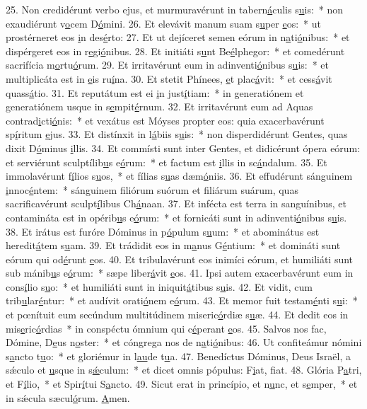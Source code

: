 25. Non credidérunt verbo ejus, et murmuravérunt in tabern\uline{á}culis s\uline{u}is:~* non exaudiérunt v\uline{o}cem D\uline{ó}mini.
26. Et elevávit manum suam s\uline{u}per \uline{e}os:~* ut prostérneret eos \uline{i}n des\uline{é}rto:
27. Et ut dejíceret semen eórum in n\uline{a}ti\uline{ó}nibus:~* et dispérgeret eos in r\uline{e}gi\uline{ó}nibus.
28. Et initiáti s\uline{u}nt Be\uline{é}lphegor:~* et comedérunt sacrifícia m\uline{o}rtu\uline{ó}rum.
29. Et irritavérunt eum in adinventi\uline{ó}nibus s\uline{u}is:~* et multiplicáta est in \uline{e}is ru\uline{í}na.
30. Et stetit Phínees, \uline{e}t plac\uline{á}vit:~* et cess\uline{á}vit quass\uline{á}tio.
31. Et reputátum est ei \uline{i}n just\uline{í}tiam:~* in generatiónem et generatiónem usque in s\uline{e}mpit\uline{é}rnum.
32. Et irritavérunt eum ad Aquas contrad\uline{i}cti\uline{ó}nis:~* et vexátus est Móyses propter eos: quia exacerbavérunt sp\uline{í}ritum \uline{e}jus.
33. Et distínxit in l\uline{á}biis s\uline{u}is:~* non disperdidérunt Gentes, quas dixit D\uline{ó}minus \uline{i}llis.
34. Et commísti sunt inter Gentes, et didicérunt ópera eórum: et serviérunt sculptílib\uline{u}s e\uline{ó}rum:~* et factum est \uline{i}llis in sc\uline{á}ndalum.
35. Et immolavérunt f\uline{í}lios s\uline{u}os,~* et fílias s\uline{u}as dæm\uline{ó}niis.
36. Et effudérunt sánguinem \uline{i}nnoc\uline{é}ntem:~* sánguinem filiórum suórum et filiárum suárum, quas sacrificavérunt sculpt\uline{í}libus Ch\uline{á}naan.
37. Et infécta est terra in sanguínibus, et contamináta est in opérib\uline{u}s e\uline{ó}rum:~* et fornicáti sunt in adinventi\uline{ó}nibus s\uline{u}is.
38. Et irátus est furóre Dóminus in p\uline{ó}pulum s\uline{u}um:~* et abominátus est heredit\uline{á}tem s\uline{u}am.
39. Et trádidit eos in m\uline{a}nus G\uline{é}ntium:~* et domináti sunt eórum qui od\uline{é}runt \uline{e}os.
40. Et tribulavérunt eos inimíci eórum, et humiliáti sunt sub mánib\uline{u}s e\uline{ó}rum:~* sæpe liber\uline{á}vit \uline{e}os.
41. Ipsi autem exacerbavérunt eum in cons\uline{í}lio s\uline{u}o:~* et humiliáti sunt in iniquit\uline{á}tibus s\uline{u}is.
42. Et vidit, cum trib\uline{u}lar\uline{é}ntur:~* et audívit orati\uline{ó}nem e\uline{ó}rum.
43. Et memor fuit testam\uline{é}nti s\uline{u}i:~* et pœnítuit eum secúndum multitúdinem miseric\uline{ó}rdiæ s\uline{u}æ.
44. Et dedit eos in mis\uline{e}ric\uline{ó}rdias~* in conspéctu ómnium qui c\uline{é}perant \uline{e}os.
45. Salvos nos fac, Dómine, D\uline{e}us n\uline{o}ster:~* et cóngrega nos de n\uline{a}ti\uline{ó}nibus:
46. Ut confiteámur nómini s\uline{a}ncto t\uline{u}o:~* et gloriémur in l\uline{au}de t\uline{u}a.
47. Benedíctus Dóminus, Deus Israël, a sǽculo et \uline{u}sque in s\uline{ǽ}culum:~* et dicet omnis pópulus: F\uline{i}at, f\uline{i}at.
48. Glória P\uline{a}tri, et F\uline{í}lio,~* et Spir\uline{í}tui S\uline{a}ncto.
49. Sicut erat in princípio, et n\uline{u}nc, et s\uline{e}mper,~* et in sǽcula sæcul\uline{ó}rum. \uline{A}men.
